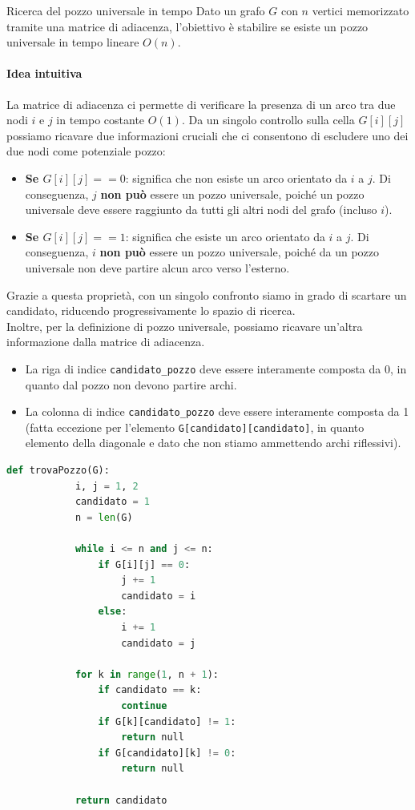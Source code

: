 \documentclass[12pt]{report}
\begin{document}
	\begin{esercizio}{Ricerca del pozzo universale in tempo}{}
		Dato un grafo $G$ con $n$ vertici memorizzato tramite una matrice di adiacenza, l'obiettivo è stabilire se esiste un pozzo universale in tempo lineare $O(n)$.
		
		\paragraph{Idea intuitiva}
		La matrice di adiacenza ci permette di verificare la presenza di un arco tra due nodi $i$ e $j$ in tempo costante $O(1)$. Da un singolo controllo sulla cella $G[i][j]$ possiamo ricavare due informazioni cruciali che ci consentono di escludere uno dei due nodi come potenziale pozzo:
		\begin{itemize}
			\item \textbf{Se $G[i][j] == 0$}: significa che non esiste un arco orientato da $i$ a $j$. Di conseguenza, $j$ \textbf{non può} essere un pozzo universale, poiché un pozzo universale deve essere raggiunto da tutti gli altri nodi del grafo (incluso $i$).
			
			\item \textbf{Se $G[i][j] == 1$}: significa che esiste un arco orientato da $i$ a $j$. Di conseguenza, $i$ \textbf{non può} essere un pozzo universale, poiché da un pozzo universale non deve partire alcun arco verso l'esterno.
		\end{itemize}
		Grazie a questa proprietà, con un singolo confronto siamo in grado di scartare un candidato, riducendo progressivamente lo spazio di ricerca.\\
		Inoltre, per la definizione di pozzo universale, possiamo ricavare un'altra informazione dalla matrice di adiacenza.
		\begin{itemize}
			\item La riga di indice \texttt{candidato\_pozzo} deve essere interamente composta da 0, in quanto dal pozzo non devono partire archi.
			
			\item La colonna di indice \texttt{candidato\_pozzo} deve essere interamente composta da 1 (fatta eccezione per l'elemento \texttt{G[candidato][candidato]}, in quanto elemento della diagonale e dato che non stiamo ammettendo archi riflessivi).
		\end{itemize}
	\end{esercizio}
	
	\begin{lstlisting}[style=stile-listings, language=Python]
		def trovaPozzo(G):
			i, j = 1, 2
			candidato = 1
			n = len(G)
			
			while i <= n and j <= n:
				if G[i][j] == 0:
					j += 1
					candidato = i
				else:
					i += 1
					candidato = j
			
			for k in range(1, n + 1):
				if candidato == k:
					continue
				if G[k][candidato] != 1:
					return null
				if G[candidato][k] != 0:
					return null
			
			return candidato
	\end{lstlisting}
	
\end{document}

